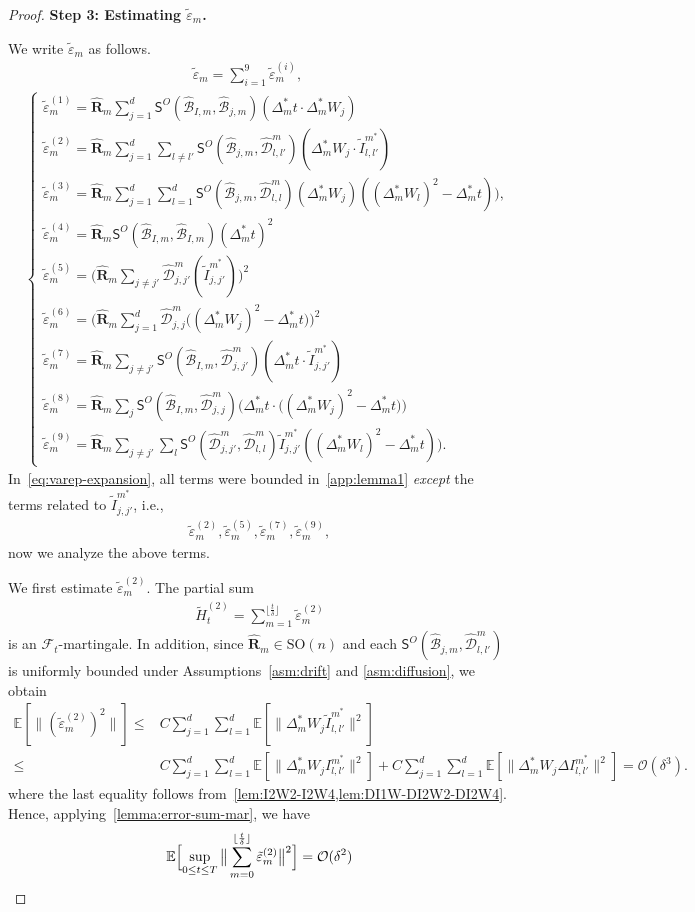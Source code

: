 \documentclass[11pt, a4paper, onecolumn]{article}
\newcommand{\SOn}{\mathrm{SO}(n)}
\newcommand{\E}{\mathbb{E}}
\newcommand{\m}{m}
\newcommand{\SSO}{\nm S^{O}}
\newcommand{\bfR}{\mathbf{R}}
\newcommand{\B}{\mathcal{B}}
\newcommand{\hatB}{\widehat{\B}}
\newcommand{\hatR}{\widehat{\bfR}}
\newcommand{\hatD}{\widehat{\tg D}}
\newcommand{\tg}[1]{\mathcal{#1}}
\newcommand{\nm}[1]{\mathsf{#1}}
\newcommand{\calO}{\mathcal{O}}
\newcommand{\ms}{{m^*}}
\newcommand{\hBIms}{{\hatB_{I,\m}}}
\newcommand{\hBjms}{{\hatB_{j,\m}}}
\newcommand{\Dms}{{\Delta^{*}_{m}}}
\newcommand{\hDjjms}{ {\hatD_{j,j}^{\m}} }
\newcommand{\hDjjpms}{ {\hatD_{j,j'}^{\m}} }
\newcommand{\hDllms}{ {\hatD_{l,l}^{\m}} }
\newcommand{\hDllpms}{ {\hatD_{l,l'}^{\m}} }
\newcommand{\tIjjpms}{ { \tilde I_{j,j'}^{\ms}} }
\newcommand{\Illpms}{ {I_{l,l'}^{\ms}} }
\newcommand{\tIllpms}{ { \tilde I_{l,l'}^{\ms}} }
\newcommand{\DIllpms}{\Delta{I_{l,l'}^{\ms}}}
\newcommand{\sumub}{{\lfloor \frac{t}{\delta} \rfloor}}
\newcommand{\hRms}{{\hatR_\m}}
\newcommand{\epprm}{\tilde\varepsilon_m}
\newcommand{\epprmn}[1]{\tilde\varepsilon_m^{(#1)}}
\newcommand{\EsupN}[1]{\E\Bigl[ \sup_{0 \le t\le T} \big\| \sum_{m=0}^{\sumub} #1 \big\|^2 \Bigr]}
\begin{document}
\begin{appendices}
\begin{proof}
\noindent\textbf{Step 3: Estimating $\epprm$.}


We write $\epprm$ as follows.
\begin{align}\label{eq:varep-expansion}
     &\qquad \qquad \qquad \qquad \qquad \qquad\epprm= \sum_{i=1}^9\epprmn{i}, \nonumber\\
     &\begin{cases}
        \epprmn{1} = \hatR_m\sum_{j=1}^d \SSO(\hBIms, \hBjms) (\Dms t \cdot \Dms W_j) \\
        \epprmn{2} = \hatR_m\sum_{j=1}^d\sum_{l\neq l'}  \SSO(\hBjms ,\hDllpms) (\Dms W_j \cdot \tIllpms) \\
        \epprmn{3} = \hatR_m\sum_{j=1}^d\sum_{l=1}^d \SSO (\hBjms, \hDllms)(\Dms W_j) ( (\Dms W_l)^2 - \Dms t)),\\
        \epprmn{4} = \hatR_m \SSO(\hBIms,\hBIms) (\Dms t)^2  \\
        \epprmn{5} = \Big( \hatR_m \sum_{j\neq j'}  \hDjjpms  (\tIjjpms)\Big)^2  \\
        \epprmn{6} = \Big( \hatR_m \sum_{j=1}^d\hDjjms \big( (\Dms W_j)^2 - \Dms t \big) \Big)^2 \\
        \epprmn{7} = \hatR_m\sum_{j\neq j'}  \SSO(\hBIms, \hDjjpms) (\Dms t \cdot \tIjjpms) \\
        \epprmn{8} = \hRms  \sum_{j} \SSO(\hBIms, \hDjjms) \Big(\Dms t \cdot \big((\Dms W_j)^2 - \Dms t\big)\Big) \\
        \epprmn{9} = \hatR_m \sum_{j\neq j'} \sum_{l} \SSO( \hDjjpms, \hDllms) \tIjjpms((\Dms W_l)^2 - \Dms t)).
    \end{cases}
\end{align}
In~\cref{eq:varep-expansion}, all terms were bounded in~\cref{app:lemma1} \emph{except} the terms related to $\tIjjpms$, i.e.,
\begin{align*}
    \epprmn{2}, \epprmn{5},\epprmn{7},\epprmn{9},
\end{align*}
now we analyze the above terms.

We first estimate $\epprmn{2}$. The partial sum
    \begin{align*}
        \tilde H^{(2)}_t = \sum_{m=1}^{\sumub} \epprmn{2}
    \end{align*}
    is an $\mathcal{F}_t$-martingale. In addition, since $\hRms \in \SOn$ and each  $\SSO(\hBjms ,\hDllpms)$ is uniformly bounded  under Assumptions~\ref{asm:drift} and \ref{asm:diffusion}, we obtain
    \begin{align*}
       \E[ \|(\epprmn{2})^2\|] \le & C\sum_{j=1}^d\sum_{l=1}^d \E[\| \Dms W_j \tIllpms\|^2] \\
        \le& C\sum_{j=1}^d\sum_{l=1}^d \E[\| \Dms W_j \Illpms\|^2] +  C\sum_{j=1}^d\sum_{l=1}^d \E[\|  \Dms W_j \DIllpms\|^2] = \calO(\delta^3).
    \end{align*}
     where the last equality follows from~\cref{lem:I2W2-I2W4,lem:DI1W-DI2W2-DI2W4}. Hence, applying~\cref{lemma:error-sum-mar}, we have
    \begin{align*}
        \EsupN{\epprmn{2}}  = \calO(\delta^2)
    \end{align*}
    

\end{proof}
\end{appendices}
\end{document}
